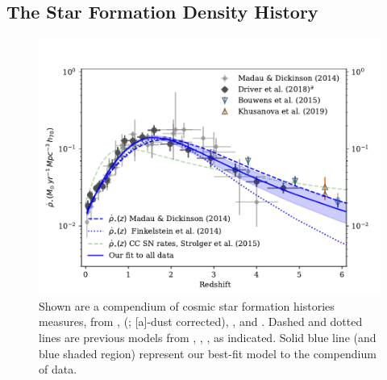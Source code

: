 \documentclass[apj]{aastex62}
\begin{document}
\subsection{The Star Formation Density History}\label{sec:csfh}
\begin{figure}[t]
   \centering
   \includegraphics[width=6.1in]{figure_csfh_today.pdf}
   \caption{\footnotesize Shown are a compendium of cosmic star formation histories measures, from \cite{Madau:2014fk}, \citeauthor{Driver:2018nr} (\citeyear{Driver:2018nr}; [a]-dust corrected), \cite{Bouwens:2015qy}, and \cite{Khusanova:2019kx}. Dashed and dotted lines are previous models from \cite{Madau:2014fk}, \cite{Finkelstein:2014fj}, \cite{Strolger:2015aa}, as indicated. Solid blue line (and blue shaded region) represent our best-fit model to the compendium of data.}
   \label{fig:csfhs}
\end{figure}
\end{document}
